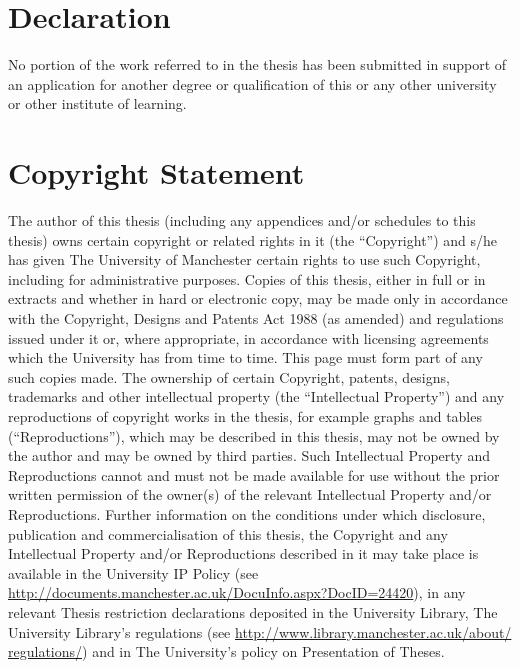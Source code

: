 \documentclass[../main.tex]{subfiles}
\begin{document}
\chapter*{Declaration}

No portion of the work referred to in the thesis has been submitted in support of an application for another degree or qualification of this or any other university or other institute of learning.

{\let\clearpage\relax\chapter*{Copyright Statement}}
The author of this thesis (including any appendices and/or schedules to this thesis) owns certain copyright or related rights in it (the “Copyright”) and s/he has given The University of Manchester certain rights to use such Copyright, including for administrative purposes.
Copies of this thesis, either in full or in extracts and whether in hard or electronic copy, may be made only in accordance with the Copyright, Designs and Patents Act 1988 (as amended) and regulations issued under it or, where appropriate, in accordance with licensing agreements which the University has from time to time. This page must form part of any such copies made.	
The ownership of certain Copyright, patents, designs, trademarks and other intellectual property (the “Intellectual Property”) and any reproductions of copyright works in the thesis, for example graphs and tables (“Reproductions”), which may be described in this thesis, may not be owned by the author and may be owned by third parties. Such Intellectual Property and Reproductions cannot and must not be made available for use without the prior written permission of the owner(s) of the relevant Intellectual Property and/or Reproductions.
Further information on the conditions under which disclosure, publication and commercialisation of this thesis, the Copyright and any Intellectual Property and/or Reproductions described in it may take place is available in the University IP Policy (see \href{http://documents.manchester.ac.uk/DocuInfo.aspx?DocID=24420}{http://documents.manchester.ac.uk/DocuInfo.aspx?DocID=24420}), in any relevant Thesis restriction declarations deposited in the University Library, The University Library’s regulations (see \href{http://www.library.manchester.ac.uk/about/regulations/}{http://www.library.manchester.ac.uk/about/ regulations/}) and in The University’s policy on Presentation of Theses.
\end{document}
